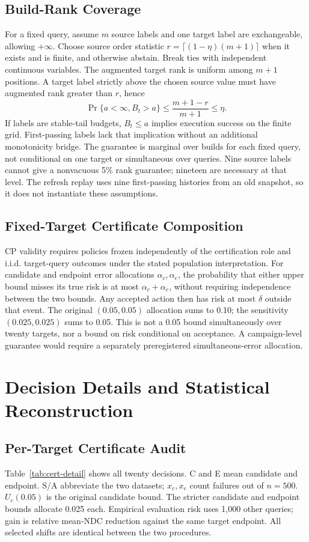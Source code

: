 \documentclass[sigconf,anonymous]{acmart}
\begin{document}
\subsection{Build-Rank Coverage}
For a fixed query, assume $m$ source labels and one target label are exchangeable, allowing $+\infty$. Choose source order statistic $r=\lceil(1-\eta)(m+1)\rceil$ when it exists and is finite, and otherwise abstain. Break ties with independent continuous variables. The augmented target rank is uniform among $m+1$ positions. A target label strictly above the chosen source value must have augmented rank greater than $r$, hence
\[
 \Pr\{a<\infty,B_t>a\}\le\frac{m+1-r}{m+1}\le\eta.
\]
If labels are stable-tail budgets, $B_t\le a$ implies execution success on the finite grid. First-passing labels lack that implication without an additional monotonicity bridge. The guarantee is marginal over builds for each fixed query, not conditional on one target or simultaneous over queries. Nine source labels cannot give a nonvacuous 5\% rank guarantee; nineteen are necessary at that level. The refresh replay uses nine first-passing histories from an old snapshot, so it does not instantiate these assumptions.

\subsection{Fixed-Target Certificate Composition}
CP validity requires policies frozen independently of the certification role and i.i.d. target-query outcomes under the stated population interpretation. For candidate and endpoint error allocations $\alpha_c,\alpha_e$, the probability that either upper bound misses its true risk is at most $\alpha_c+\alpha_e$, without requiring independence between the two bounds. Any accepted action then has risk at most $\delta$ outside that event. The original $(0.05,0.05)$ allocation sums to 0.10; the sensitivity $(0.025,0.025)$ sums to 0.05. This is not a 0.05 bound simultaneously over twenty targets, nor a bound on risk conditional on acceptance. A campaign-level guarantee would require a separately preregistered simultaneous-error allocation.

\section{Decision Details and Statistical Reconstruction}
\subsection{Per-Target Certificate Audit}
Table~\ref{tab:cert-detail} shows all twenty decisions. C and E mean candidate and endpoint. S/A abbreviate the two datasets; $x_c,x_e$ count failures out of $n=500$. $U_c(0.05)$ is the original candidate bound. The stricter candidate and endpoint bounds allocate 0.025 each. Empirical evaluation risk uses 1,000 other queries; gain is relative mean-NDC reduction against the same target endpoint. All selected shifts are identical between the two procedures.
\end{document}
